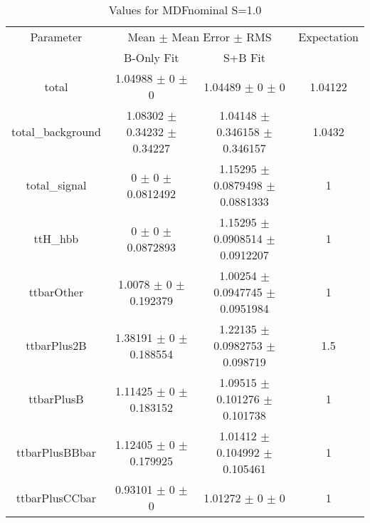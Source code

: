 \begin{table}
\centering
\caption{Values for MDFnominal S=1.0}
\begin{tabular}{cccc}
\toprule
Parameter & \multicolumn{2}{c}{Mean $\pm$ Mean Error $\pm$ RMS} & Expectation\\
 & B-Only Fit & S+B Fit & \\
\midrule
total & \num{1.04988} $\pm$ \num{0} $\pm$ \num{0} & \num{1.04489} $\pm$ \num{0} $\pm$ \num{0} & \num{1.04122}\\
total\_background & \num{1.08302} $\pm$ \num{0.34232} $\pm$ \num{0.34227} & \num{1.04148} $\pm$ \num{0.346158} $\pm$ \num{0.346157} & \num{1.0432}\\
total\_signal & \num{0} $\pm$ \num{0} $\pm$ \num{0.0812492} & \num{1.15295} $\pm$ \num{0.0879498} $\pm$ \num{0.0881333} & \num{1}\\
ttH\_hbb & \num{0} $\pm$ \num{0} $\pm$ \num{0.0872893} & \num{1.15295} $\pm$ \num{0.0908514} $\pm$ \num{0.0912207} & \num{1}\\
ttbarOther & \num{1.0078} $\pm$ \num{0} $\pm$ \num{0.192379} & \num{1.00254} $\pm$ \num{0.0947745} $\pm$ \num{0.0951984} & \num{1}\\
ttbarPlus2B & \num{1.38191} $\pm$ \num{0} $\pm$ \num{0.188554} & \num{1.22135} $\pm$ \num{0.0982753} $\pm$ \num{0.098719} & \num{1.5}\\
ttbarPlusB & \num{1.11425} $\pm$ \num{0} $\pm$ \num{0.183152} & \num{1.09515} $\pm$ \num{0.101276} $\pm$ \num{0.101738} & \num{1}\\
ttbarPlusBBbar & \num{1.12405} $\pm$ \num{0} $\pm$ \num{0.179925} & \num{1.01412} $\pm$ \num{0.104992} $\pm$ \num{0.105461} & \num{1}\\
ttbarPlusCCbar & \num{0.93101} $\pm$ \num{0} $\pm$ \num{0} & \num{1.01272} $\pm$ \num{0} $\pm$ \num{0} & \num{1}\\
\bottomrule
\end{tabular}
\end{table}